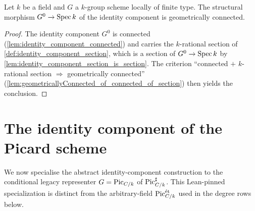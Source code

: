 \begin{lemma}\leanok
  \label{lem:identity_component_geometrically_connected}
  Let \(k\) be a field and \(G\) a \(k\)-group scheme locally of finite
  type. The structural morphism \(G^0 \to \operatorname{Spec} k\) of the identity
  component is geometrically connected.
\end{lemma}
\begin{proof}
  \leanok
  The identity component \(G^0\) is connected
  (\cref{lem:identity_component_connected}) and carries the \(k\)-rational
  section of \cref{def:identity_component_section}, which is a section of
  \(G^0 \to \operatorname{Spec} k\) by \cref{lem:identity_component_section_is_section}.
  The criterion ``connected \(+\) \(k\)-rational section \(\Rightarrow\)
  geometrically connected''
  (\cref{lem:geometricallyConnected_of_connected_of_section}) then yields
  the conclusion.
\end{proof}

\section{The identity component of the Picard scheme}
\label{sec:pic0_definition}

We now specialise the abstract identity-component construction to the
conditional legacy representer \(G = \operatorname{Pic}_{C/k}\) of
\(\operatorname{Pic}^\sharp_{C/k}\). This Lean-pinned specialization is distinct from the
arbitrary-field \(\operatorname{Pic}^{\mathrm{\acute{e}t}}_{C/k}\) used in the degree rows below.

